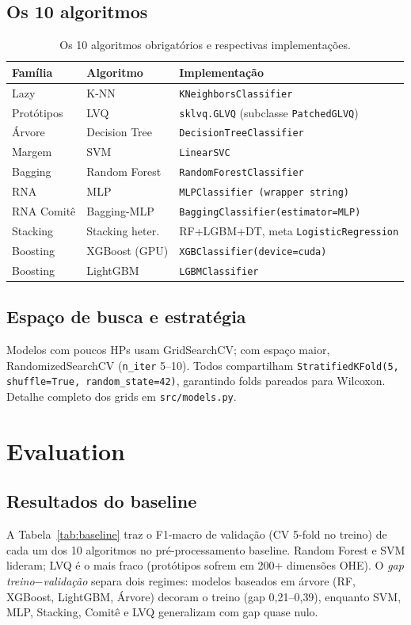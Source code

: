 \documentclass[12pt,a4paper]{article}
\begin{document}
\subsection{Os 10 algoritmos}
\begin{table}[h]\centering
\begin{tabular}{lll}
\toprule
\textbf{Família} & \textbf{Algoritmo} & \textbf{Implementação} \\
\midrule
Lazy            & K-NN            & \texttt{KNeighborsClassifier} \\
Protótipos      & LVQ             & \texttt{sklvq.GLVQ} (subclasse \texttt{PatchedGLVQ}) \\
Árvore          & Decision Tree   & \texttt{DecisionTreeClassifier} \\
Margem          & SVM             & \texttt{LinearSVC} \\
Bagging         & Random Forest   & \texttt{RandomForestClassifier} \\
RNA             & MLP             & \texttt{MLPClassifier (wrapper string)} \\
RNA Comitê      & Bagging-MLP     & \texttt{BaggingClassifier(estimator=MLP)} \\
Stacking        & Stacking heter. & RF+LGBM+DT, meta \texttt{LogisticRegression} \\
Boosting        & XGBoost (GPU)   & \texttt{XGBClassifier(device=cuda)} \\
Boosting        & LightGBM        & \texttt{LGBMClassifier} \\
\bottomrule
\end{tabular}
\caption{Os 10 algoritmos obrigatórios e respectivas implementações.}
\end{table}

\subsection{Espaço de busca e estratégia}
Modelos com poucos HPs usam GridSearchCV; com espaço maior, RandomizedSearchCV (\texttt{n\_iter} 5--10). Todos compartilham \texttt{StratifiedKFold(5, shuffle=True, random\_state=42)}, garantindo folds pareados para Wilcoxon. Detalhe completo dos grids em \texttt{src/models.py}.

\section{Evaluation}
\subsection{Resultados do baseline}
A Tabela~\ref{tab:baseline} traz o F1-macro de validação (CV 5-fold no treino) de cada um dos 10 algoritmos no pré-processamento baseline. Random Forest e SVM lideram; LVQ é o mais fraco (protótipos sofrem em 200+ dimensões OHE). O \emph{gap treino$-$validação} separa dois regimes: modelos baseados em árvore (RF, XGBoost, LightGBM, Árvore) decoram o treino (gap 0{,}21--0{,}39), enquanto SVM, MLP, Stacking, Comitê e LVQ generalizam com gap quase nulo.
\end{document}
